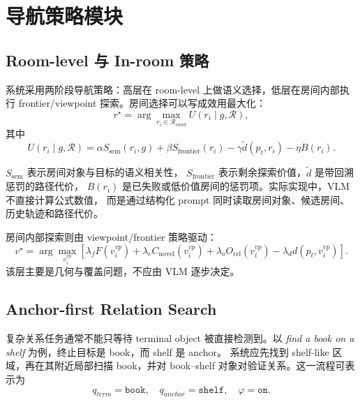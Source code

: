 \documentclass[UTF8,zihao=-4]{ctexart}
\begin{document}
\section{导航策略模块}

\subsection{Room-level 与 In-room 策略}

系统采用两阶段导航策略：高层在 room-level 上做语义选择，低层在房间内部执行
frontier/viewpoint 探索。房间选择可以写成效用最大化：
\begin{equation}
  r^\star =
  \arg\max_{r_i\in\mathcal{R}_{cand}}
  U(r_i\mid g,\mathcal{R}),
\end{equation}
其中
\begin{equation}
  U(r_i\mid g,\mathcal{R})
  =
  \alpha S_{\mathrm{sem}}(r_i,g)
  + \beta S_{\mathrm{frontier}}(r_i)
  - \gamma \tilde{d}(p_t,r_i)
  - \eta B(r_i).
  \label{eq:room_utility}
\end{equation}

$S_{\mathrm{sem}}$ 表示房间对象与目标的语义相关性，
$S_{\mathrm{frontier}}$ 表示剩余探索价值，$\tilde{d}$ 是带回溯惩罚的路径代价，
$B(r_i)$ 是已失败或低价值房间的惩罚项。实际实现中，VLM 不直接计算公式数值，
而是通过结构化 prompt 同时读取房间对象、候选房间、历史轨迹和路径代价。

房间内部探索则由 viewpoint/frontier 策略驱动：
\begin{equation}
  v^\star =
  \arg\max_{v_i^{vp}}
  \left[
  \lambda_f F(v_i^{vp})
  + \lambda_c C_{\mathrm{novel}}(v_i^{vp})
  + \lambda_o O_{\mathrm{rel}}(v_i^{vp})
  - \lambda_d d(p_t,v_i^{vp})
  \right].
  \label{eq:viewpoint_score}
\end{equation}
该层主要是几何与覆盖问题，不应由 VLM 逐步决定。

\subsection{Anchor-first Relation Search}

复杂关系任务通常不能只等待 terminal object 被直接检测到。以
\textit{find a book on a shelf} 为例，终止目标是 book，而 shelf 是 anchor。
系统应先找到 shelf-like 区域，再在其附近局部扫描 book，并对 book--shelf
对象对验证关系。这一流程可表示为
\begin{equation}
  q_{term}=\texttt{book},
  \quad
  q_{anchor}=\texttt{shelf},
  \quad
  \varphi=\texttt{on}.
\end{equation}
\end{document}
